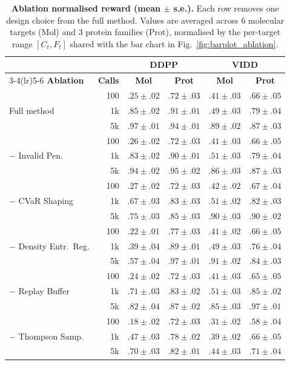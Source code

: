 \documentclass{article}
\begin{document}
\begin{table}[t]
\centering
\footnotesize
\setlength{\tabcolsep}{4.5pt}
\caption{\textbf{Ablation normalised reward (mean $\pm$ s.e.).} Each row removes one design choice from the full method. Values are averaged across 6 molecular targets (Mol) and 3 protein families (Prot), normalised by the per-target range $[C_t, F_t]$ shared with the bar chart in Fig.~\ref{fig:barplot_ablation}.}
\label{tab:ablation_numbers}
\begin{tabular}{@{}lrcccc@{}}
\toprule
 & & \multicolumn{2}{c}{\textbf{DDPP}} & \multicolumn{2}{c}{\textbf{VIDD}} \\
\cmidrule(lr){3-4}\cmidrule(lr){5-6}
\textbf{Ablation} & \textbf{Calls} & \textbf{Mol} & \textbf{Prot} & \textbf{Mol} & \textbf{Prot} \\
\midrule
\multirow{3}{*}{Full method}
  & 100   & $.25{\pm}.02$ & $.72{\pm}.03$ & $.41{\pm}.03$ & $.66{\pm}.05$ \\
  & 1k    & $.85{\pm}.02$ & $.91{\pm}.01$ & $.49{\pm}.03$ & $.79{\pm}.04$ \\
  & 5k    & $.97{\pm}.01$ & $.94{\pm}.01$ & $.89{\pm}.02$ & $.87{\pm}.03$ \\
\midrule
\multirow{3}{*}{$-$ Invalid Pen.}
  & 100   & $.26{\pm}.02$ & $.72{\pm}.03$ & $.41{\pm}.03$ & $.66{\pm}.05$ \\
  & 1k    & $.83{\pm}.02$ & $.90{\pm}.01$ & $.51{\pm}.03$ & $.79{\pm}.04$ \\
  & 5k    & $.94{\pm}.02$ & $.95{\pm}.02$ & $.86{\pm}.03$ & $.87{\pm}.03$ \\
\midrule
\multirow{3}{*}{$-$ CVaR Shaping}
  & 100   & $.27{\pm}.02$ & $.72{\pm}.03$ & $.42{\pm}.02$ & $.67{\pm}.04$ \\
  & 1k    & $.67{\pm}.03$ & $.83{\pm}.03$ & $.51{\pm}.02$ & $.82{\pm}.03$ \\
  & 5k    & $.75{\pm}.03$ & $.85{\pm}.03$ & $.90{\pm}.03$ & $.90{\pm}.02$ \\
\midrule
\multirow{3}{*}{$-$ Density Entr.\ Reg.}
  & 100   & $.22{\pm}.01$ & $.77{\pm}.03$ & $.41{\pm}.02$ & $.66{\pm}.05$ \\
  & 1k    & $.39{\pm}.04$ & $.89{\pm}.01$ & $.49{\pm}.03$ & $.76{\pm}.04$ \\
  & 5k    & $.57{\pm}.04$ & $.97{\pm}.01$ & $.91{\pm}.02$ & $.84{\pm}.03$ \\
\midrule
\multirow{3}{*}{$-$ Replay Buffer}
  & 100   & $.24{\pm}.02$ & $.72{\pm}.03$ & $.41{\pm}.03$ & $.65{\pm}.05$ \\
  & 1k    & $.71{\pm}.03$ & $.83{\pm}.02$ & $.51{\pm}.03$ & $.85{\pm}.02$ \\
  & 5k    & $.82{\pm}.04$ & $.87{\pm}.02$ & $.85{\pm}.03$ & $.97{\pm}.01$ \\
\midrule
\multirow{3}{*}{$-$ Thompson Samp.}
  & 100   & $.18{\pm}.02$ & $.72{\pm}.03$ & $.31{\pm}.02$ & $.58{\pm}.04$ \\
  & 1k    & $.47{\pm}.03$ & $.78{\pm}.02$ & $.39{\pm}.02$ & $.66{\pm}.05$ \\
  & 5k    & $.70{\pm}.03$ & $.82{\pm}.01$ & $.44{\pm}.03$ & $.71{\pm}.04$ \\
\bottomrule
\end{tabular}
\end{table}
\end{document}

